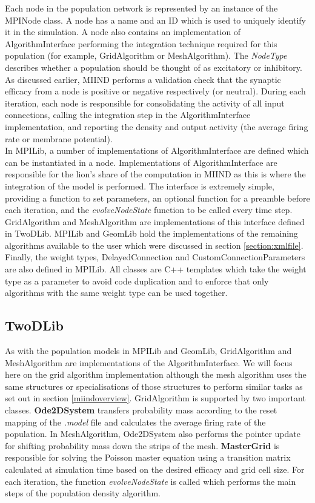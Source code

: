 \documentclass[utf8]{frontiersSCNS} %
\begin{document}
Each node in the population network is represented by an instance of the MPINode class. A node has a name and an ID which is used to uniquely identify it in the simulation. A node also contains an implementation of AlgorithmInterface performing the integration technique required for this population (for example, GridAlgorithm or MeshAlgorithm). The \textit{NodeType} describes whether a population should be thought of as excitatory or inhibitory. As discussed earlier, MIIND performs a validation check that the synaptic efficacy from a node is positive or negative respectively (or neutral). During each iteration, each node is responsible for consolidating the activity of all input connections, calling the integration step in the AlgorithmInterface implementation, and reporting the density and output activity (the average firing rate or membrane potential).\\

In MPILib, a number of implementations of AlgorithmInterface are defined which can be instantiated in a node. Implementations of AlgorithmInterface are responsible for the lion's share of the computation in MIIND as this is where the integration of the model is performed. The interface is extremely simple, providing a function to set parameters, an optional function for a preamble before each iteration, and the \textit{evolveNodeState} function to be called every time step. GridAlgorithm and MeshAlgorithm are implementations of this interface defined in TwoDLib. MPILib and GeomLib hold the implementations of the remaining algorithms available to the user which were discussed in section \ref{section:xmlfile}. Finally, the weight types, DelayedConnection and CustomConnectionParameters are also defined in MPILib. All classes are C++ templates which take the weight type as a parameter to avoid code duplication and to enforce that only algorithms with the same weight type can be used together.\\

\subsection{TwoDLib}
As with the population models in MPILib and GeomLib, GridAlgorithm and MeshAlgorithm are implementations of the AlgorithmInterface. We will focus here on the grid algorithm implementation although the mesh algorithm uses the same structures or specialisations of those structures to perform similar tasks as set out in section \ref{miindoverview}. GridAlgorithm is supported by two important classes. \textbf{Ode2DSystem} transfers probability mass according to the reset mapping of the \textit{.model} file and calculates the average firing rate of the population. In MeshAlgorithm, Ode2DSystem also performs the pointer update for shifting probability mass down the strips of the mesh. \textbf{MasterGrid} is responsible for solving the Poisson master equation using a transition matrix calculated at simulation time based on the desired efficacy and grid cell size. For each iteration, the function \textit{evolveNodeState} is called which performs the main steps of the population density algorithm. \\
\end{document}
